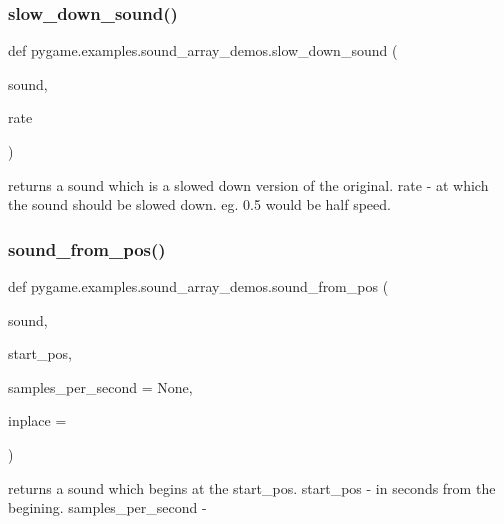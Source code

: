 \subsubsection{\texorpdfstring{slow\+\_\+down\+\_\+sound()}{slow\_down\_sound()}}
{\footnotesize\ttfamily def pygame.\+examples.\+sound\+\_\+array\+\_\+demos.\+slow\+\_\+down\+\_\+sound (\begin{DoxyParamCaption}\item[{}]{sound,  }\item[{}]{rate }\end{DoxyParamCaption})}

\begin{DoxyVerb}returns a sound which is a slowed down version of the original.
       rate - at which the sound should be slowed down.  eg. 0.5 would be half speed.
\end{DoxyVerb}
 \mbox{\label{namespacepygame_1_1examples_1_1sound__array__demos_a3ef2a5278ab9ef368dad0fe4a8d72003}} 
\subsubsection{\texorpdfstring{sound\+\_\+from\+\_\+pos()}{sound\_from\_pos()}}
{\footnotesize\ttfamily def pygame.\+examples.\+sound\+\_\+array\+\_\+demos.\+sound\+\_\+from\+\_\+pos (\begin{DoxyParamCaption}\item[{}]{sound,  }\item[{}]{start\+\_\+pos,  }\item[{}]{samples\+\_\+per\+\_\+second = {\ttfamily None},  }\item[{}]{inplace = {} }\end{DoxyParamCaption})}

\begin{DoxyVerb}returns a sound which begins at the start_pos.
     start_pos - in seconds from the begining.
     samples_per_second - 
\end{DoxyVerb}
 